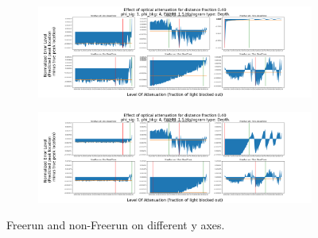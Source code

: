 \documentclass{beamer}
\begin{document}
\begin{frame}
  \begin{figure}[H]
    \centering
    \begin{subfigure}[b]{1\textwidth}
      \includegraphics[width=1\linewidth]{zoomedFreeExample.png}
      \label{fig:zoomedExample}
    \end{subfigure}
    \begin{subfigure}[b]{1\textwidth}
      \includegraphics[width=1\linewidth]{sharedFreeExample.png}
      \label{fig:sharedExample}
    \end{subfigure}
    \caption{\label{fig:freerunComparsion}Freerun and non-Freerun on different y axes.}
  \end{figure}
\end{frame}
\end{document}
